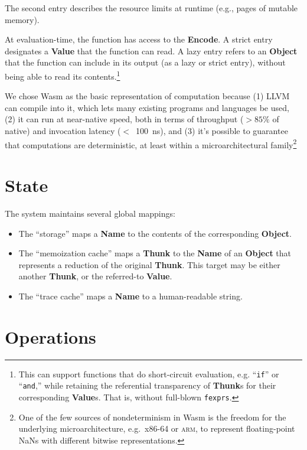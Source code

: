 \documentclass{article}
\newcommand{\valuex}{\textbf{Value}\xspace}
\newcommand{\valuexs}{\textbf{Value}s\xspace}
\newcommand{\object}{\textbf{Object}\xspace}
\newcommand{\encode}{\textbf{Encode}\xspace}
\newcommand{\thunk}{\textbf{Thunk}\xspace}
\newcommand{\thunks}{\textbf{Thunk}s\xspace}
\newcommand{\name}{\textbf{Name}\xspace}
\newcommand{\bs}{\vspace{\baselineskip}}
\begin{document}
The second entry describes the resource limits at runtime (e.g.,
pages of mutable memory).

\bs

At evaluation-time, the function has access to the \encode. A strict
entry designates a \valuex that the function can read. A lazy entry
refers to an \object that the function can include in its output (as a
lazy or strict entry), without being able to read its
contents.\footnote{This can support functions that do short-circuit
evaluation, e.g. ``\texttt{if}'' or ``\texttt{and},'' while retaining
the referential transparency of \thunks for their corresponding
\valuexs. That is, without full-blown \texttt{fexprs}.}

\bs

We chose Wasm as the basic representation of computation because (1)
LLVM can compile into it, which lets many existing programs and
languages be used, (2) it can run at near-native speed, both in terms
of throughput ($>85\%$ of native) and invocation latency ($<$~100~ns),
and (3) it's possible to guarantee that computations are
deterministic, at least within a microarchitectural
family\footnote{One of the few sources of nondeterminism in Wasm is
the freedom for the underlying microarchitecture, e.g.~x86-64 or \textsc{arm}, to represent floating-point NaNs
with different bitwise representations.}

\section{State}

The system maintains several global mappings:
\begin{itemize}[itemsep=0pt]
\item The ``storage'' maps a \name to the contents of the corresponding \object.

\item The ``memoization cache'' maps a \thunk to the \name of an \object that represents
  a reduction of the original \thunk. This target may be either another \thunk, or the referred-to \valuex.

\item The ``trace cache'' maps a \name to a human-readable string.
\end{itemize}

\section{Operations}
\end{document}
